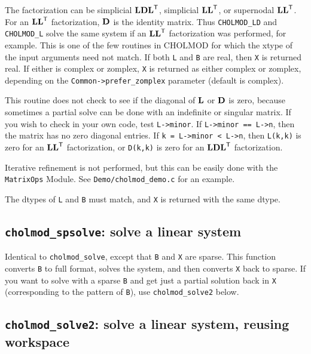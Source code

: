 \documentclass[11pt]{article}
\newcommand{\m}[1]{{\bf{#1}}}       %
\newcommand{\tr}{^{\sf T}}          %
\begin{document}
The factorization can be simplicial $\m{LDL}\tr$, simplicial $\m{LL}\tr$, or
supernodal $\m{LL}\tr$.  For an $\m{LL}\tr$ factorization, $\m{D}$ is the
identity matrix.  Thus {\tt CHOLMOD\_LD} and {\tt CHOLMOD\_L} solve the same
system if an $\m{LL}\tr$ factorization was performed, for example.  This is one
of the few routines in CHOLMOD for which the xtype of the input arguments need
not match.  If both {\tt L} and {\tt B} are real, then {\tt X} is returned
real.  If either is complex or zomplex, {\tt X} is returned as either complex
or zomplex, depending on the {\tt Common->prefer\_zomplex} parameter (default
is complex).

This routine does not check to see if the diagonal of $\m{L}$ or $\m{D}$ is
zero, because sometimes a partial solve can be done with an indefinite or
singular matrix.  If you wish to check in your own code, test {\tt L->minor}.
If {\tt L->minor == L->n}, then the matrix has no zero diagonal entries.  If
{\tt k = L->minor < L->n}, then {\tt L(k,k)} is zero for an $\m{LL}\tr$
factorization, or {\tt D(k,k)} is zero for an $\m{LDL}\tr$ factorization.

Iterative refinement is not performed, but this can be easily done with
the {\tt MatrixOps} Module.  See {\tt Demo/cholmod\_demo.c} for an example.

The dtypes of \verb'L' and \verb'B' must match, and \verb'X' is returned
with the same dtype.

\subsection{{\tt cholmod\_spsolve}: solve a linear system}


Identical to {\tt cholmod\_solve}, except that {\tt B} and {\tt X} are sparse.
This function converts {\tt B} to full format, solves the system, and then
converts {\tt X} back to sparse.  If you want to solve with a sparse {\tt B}
and get just a partial solution back in {\tt X} (corresponding to the pattern
of {\tt B}), use {\tt cholmod\_solve2} below.

\subsection{{\tt cholmod\_solve2}: solve a linear system, reusing workspace}
\end{document}
